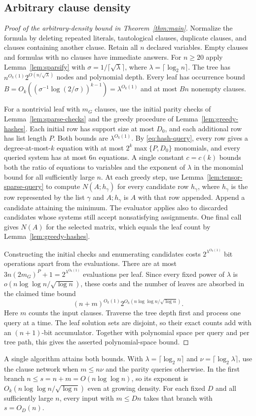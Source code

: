 \subsection{Arbitrary clause density}\label{subsec:sharp-dense}
\begin{proof}[Proof of the arbitrary-density bound in
Theorem~\ref{thm:main}]
Normalize the formula by deleting repeated literals, tautological
clauses, duplicate clauses, and clauses containing another clause.
Retain all $n$ declared variables. Empty clauses and
formulas with no clauses have immediate answers. For $n\ge20$
apply Lemma~\ref{lem:sparsify} with
$\sigma=1/\lceil\sqrt{\lambda}\rceil$, where
$\lambda=\lceil\log_2 n\rceil$. The tree has
$n^{O_k(1)}2^{O(n/\sqrt{\lambda})}$ nodes and polynomial depth.
Every leaf has occurrence bound
$B=O_k((\sigma^{-1}\log(2/\sigma))^{k-1})=\lambda^{O_k(1)}$
and at most $Bn$ nonempty clauses.

For a nontrivial leaf with $m_G$ clauses, use the initial parity
checks of Lemma~\ref{lem:sparse-checks} and the greedy procedure
of Lemma~\ref{lem:greedy-hashes}. Each initial row has support size
at most $D_0$, and each additional row has list length $P$.
Both bounds are $\lambda^{O_k(1)}$. By \eqref{eq:hash-query}, every row
gives a degree-at-most-$k$ equation with at most
$2^k\max\{P,D_0\}$ monomials, and every queried system has at
most $6n$ equations. A single constant $c=c(k)$ bounds both the
ratio of equations to variables and the exponent of $\lambda$ in
the monomial bound for all sufficiently large $n$.
At each greedy step, use Lemma~\ref{lem:tensor-sparse-query} to
compute $N(A;h_\gamma)$ for every candidate row $h_\gamma$, where
$h_\gamma$ is the row represented by the list $\gamma$ and
$A;h_\gamma$ is $A$ with that row appended. Append a candidate
attaining the minimum. The evaluator applies also to
discarded candidates whose systems still accept nonsatisfying
assignments. One final call gives $N(A)$ for the selected matrix,
which equals the leaf count by Lemma~\ref{lem:greedy-hashes}.

Constructing the initial checks and enumerating candidates costs
$2^{\lambda^{O_k(1)}}$ bit operations apart from the evaluations.
There are at most $3n(2m_G)^P+1=2^{\lambda^{O_k(1)}}$ evaluations
per leaf. Since every fixed power of $\lambda$ is
$o(n\log\log n/\sqrt{\log n})$, these costs and the number of leaves
are absorbed in the claimed time bound
\[
 (n+m)^{O_k(1)}2^{O_k(n\log\log n/\sqrt{\log n})}.
\]
Here $m$ counts the input clauses. Traverse the tree
depth first and process one query at a time. The leaf solution sets
are disjoint, so their exact counts add with an $(n+1)$-bit
accumulator. Together with polynomial space per query and per
tree path, this gives the asserted polynomial-space bound.
\end{proof}

A single algorithm attains both bounds. With
$\lambda=\lceil\log_2 n\rceil$ and $\nu=\lceil\log_2\lambda\rceil$,
use the clause network when $m\le n\nu$ and the parity queries
otherwise. In the first branch $n\le s=n+m=O(n\log\log n)$,
so its exponent is $O_k(n\log\log n/\sqrt{\log n})$ even at growing
density. For each fixed $D$ and all sufficiently large $n$, every
input with $m\le Dn$ takes that branch with $s=O_D(n)$.
